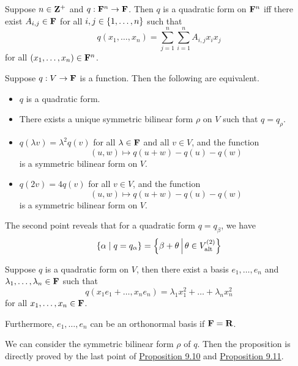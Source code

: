 \documentclass[12pt,a4paper]{article}
\begin{document}
    \begin{prop}
        Suppose $n\in\mathbf{Z}^+$ and $q:\mathbf{F}^n\to\mathbf{F}$. Then $q$ is a quadratic form on $\mathbf{F}^n$ iff there exist $A_{i,j}\in\mathbf{F}$ for all $i,j\in\left\{1,\dots,n\right\}$ such that
        $$
        q(x_1,\dots,x_n)=\sum_{j=1}^n\sum_{i=1}^n A_{i,j}x_ix_j
        $$
        for all $(x_1,\dots,x_n)\in\mathbf{F}^n$.
    \end{prop}
    \hfill

    \begin{prop}
        Suppose $q:V\to\mathbf{F}$ is a function. Then the following are equivalent.
        \begin{itemize}
            \item $q$ is a quadratic form.
            \item There exists a unique symmetric bilinear form $\rho $ on $V$ such that $q=q_\rho$.
            \item $q(\lambda v)=\lambda^2q(v)$ for all $\lambda\in\mathbf{F}$ and all $v\in V$, and the function
            $$
            (u,w)\mapsto q(u+w)-q(u)-q(w)
            $$
            is a symmetric bilinear form on $V$.
            \item $q(2v)=4q(v)$ for all $v\in V$, and the function
            $$
            (u,w)\mapsto q(u+w)-q(u)-q(w)
            $$
            is a symmetric bilinear form on $V$.
        \end{itemize}
    \end{prop}
    \begin{remark}
        The second point reveals that for a quadratic form $q=q_\beta$, we have 
        $$
        \left\{\alpha\mid q=q_\alpha\right\}=\left\{\beta+\theta\,\middle|\,\theta\in V^{(2)}_{\mathrm{alt}}\right\}
        $$
    \end{remark}
    \hfill

    \begin{prop}
        Suppose $q$ is a quadratic form on $V$, then there exist a basis $e_1,\dots,e_n$ and $\lambda_1,\dots,\lambda_n\in\mathbf{F}$ such that
        $$
        q(x_1e_1+\dots,x_ne_n)=\lambda_1x_1^2+\dots+\lambda_nx_n^2
        $$
        for all $x_1,\dots,x_n\in\mathbf{F}$.
        
        Furthermore, $e_1,\dots,e_n$ can be an orthonormal basis if $\mathbf{F}=\mathbf{R}$. 
    \end{prop}
    \begin{remark}
        We can consider the symmetric bilinear form $\rho$ of $q$. Then the proposition is directly proved by the last point of \hyperref[9.10]{Proposition 9.10} and \hyperref[9.11]{Proposition 9.11}.
    \end{remark}
    \hfill
\end{document}
